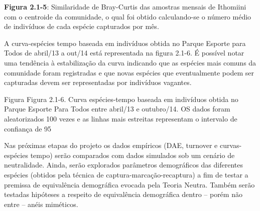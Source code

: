 \textbf{Figura 2.1-5}: Similaridade de Bray-Curtis das amostras mensais de Ithomiini com o centroide da comunidade, o qual foi obtido calculando-se o número médio de indivíduos de cada espécie capturados por mês.

A curva-espécies tempo baseada em indivíduos obtida no Parque Esporte para Todos de abril/13 a out/14 está representada na figura 2.1-6. É possível notar uma tendência à estabilização da curva indicando que as espécies mais comuns da comunidade foram registradas e que novas espécies que eventualmente podem ser capturadas devem ser representadas por indivíduos vagantes.

Figura
Figura 2.1-6. Curva espécies-tempo baseada em indivíduos obtida no Parque Esporte Para Todos entre abril/13 e outubro/14. OS dados foram aleatorizados 100 vezes e as linhas mais estreitas representam o intervalo de confiança de 95%

Nas próximas etapas do projeto os dados empíricos (DAE, turnover e curvas-espécies tempo) serão comparados com dados simulados sob um cenário de neutralidade. Ainda, serão explorados parâmetros demográficos das diferentes espécies (obtidos pela técnica de captura-marcação-recaptura) a fim de testar a premissa de equivalência demográfica evocada pela Teoria Neutra. Também serão testadas hipóteses a respeito de equivalência demográfica dentro – porém não entre – anéis miméticos.
